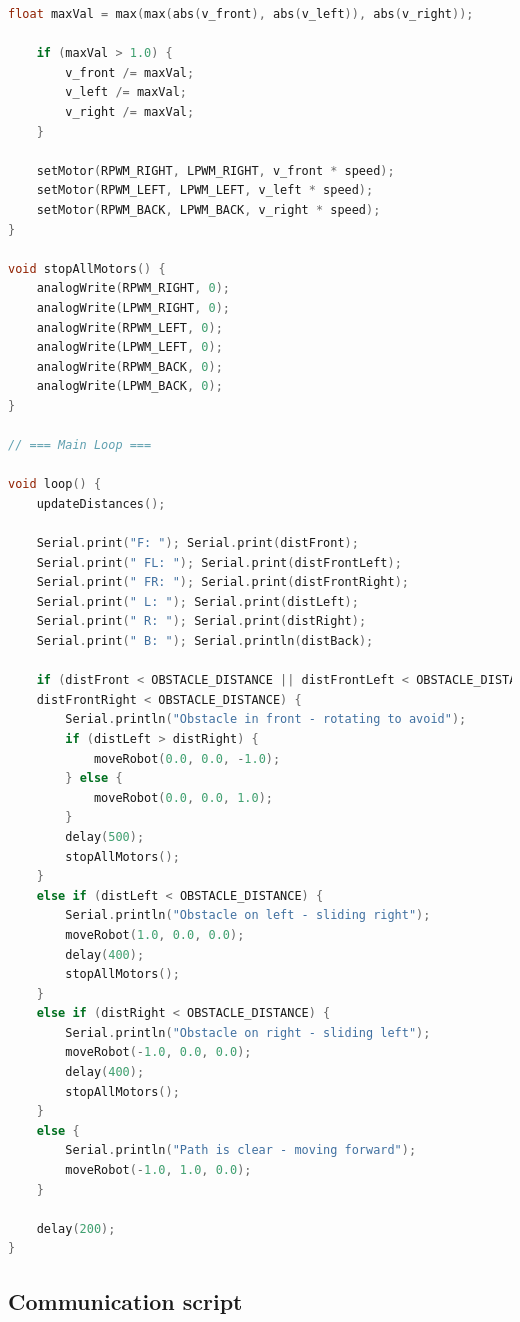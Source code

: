 \documentclass{article}
\begin{document}
\begin{lstlisting}[language=C, basicstyle=\ttfamily\footnotesize, frame=single, xleftmargin=10mm, xrightmargin=10mm]
    float maxVal = max(max(abs(v_front), abs(v_left)), abs(v_right));

    if (maxVal > 1.0) {
        v_front /= maxVal;
        v_left /= maxVal;
        v_right /= maxVal;
    }

    setMotor(RPWM_RIGHT, LPWM_RIGHT, v_front * speed);
    setMotor(RPWM_LEFT, LPWM_LEFT, v_left * speed);
    setMotor(RPWM_BACK, LPWM_BACK, v_right * speed);
}

void stopAllMotors() {
    analogWrite(RPWM_RIGHT, 0);
    analogWrite(LPWM_RIGHT, 0);
    analogWrite(RPWM_LEFT, 0);
    analogWrite(LPWM_LEFT, 0);
    analogWrite(RPWM_BACK, 0);
    analogWrite(LPWM_BACK, 0);
}

// === Main Loop ===

void loop() {
    updateDistances();

    Serial.print("F: "); Serial.print(distFront);
    Serial.print(" FL: "); Serial.print(distFrontLeft);
    Serial.print(" FR: "); Serial.print(distFrontRight);
    Serial.print(" L: "); Serial.print(distLeft);
    Serial.print(" R: "); Serial.print(distRight);
    Serial.print(" B: "); Serial.println(distBack);

    if (distFront < OBSTACLE_DISTANCE || distFrontLeft < OBSTACLE_DISTANCE || 
    distFrontRight < OBSTACLE_DISTANCE) {
        Serial.println("Obstacle in front - rotating to avoid");
        if (distLeft > distRight) {
            moveRobot(0.0, 0.0, -1.0);
        } else {
            moveRobot(0.0, 0.0, 1.0);
        }
        delay(500);
        stopAllMotors();
    }
    else if (distLeft < OBSTACLE_DISTANCE) {
        Serial.println("Obstacle on left - sliding right");
        moveRobot(1.0, 0.0, 0.0);
        delay(400);
        stopAllMotors();
    }
    else if (distRight < OBSTACLE_DISTANCE) {
        Serial.println("Obstacle on right - sliding left");
        moveRobot(-1.0, 0.0, 0.0);
        delay(400);
        stopAllMotors();
    }
    else {
        Serial.println("Path is clear - moving forward");
        moveRobot(-1.0, 1.0, 0.0);
    }

    delay(200);
}
\end{lstlisting}
\newpage
\subsection{Communication script} %
\begin{lstlisting}[language=C, basicstyle=\ttfamily\footnotesize, frame=single, xleftmargin=10mm, xrightmargin=10mm]

\end{lstlisting}
\end{document}
